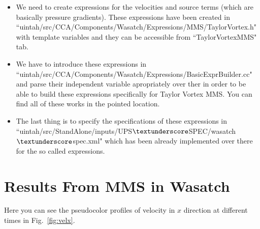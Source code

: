 \documentclass[10pt] {article}
\begin{document}
\begin{itemize}
\item
We need to create expressions for the velocities and source terms (which are basically pressure gradients). These expressions have been created in ``uintah/src/CCA/Components/Wasatch/Expressions/MMS/TaylorVortex.h" with template variables and they can be accessible from ``TaylorVortexMMS" tab.
\item
We have to introduce these expressions in\\``uintah/src/CCA/Components/Wasatch/Expressions/BasicExprBuilder.cc" and parse their independent variable apropriately over ther in order to be able to build these expressions specifically for Taylor Vortex MMS. You can find all of these works in the pointed location. 
\item
The last thing is to specify the specifications of these expressions in\\``uintah/src/StandAlone/inputs/UPS$\textunderscore$SPEC/wasatch$\textunderscore$spec.xml" which has been already implemented over there for the so called expressions. 
\end{itemize}


\section{Results From MMS in Wasatch}

Here you can see the pseudocolor profiles of velocity in $x$ direction at different times in Fig.~\ref{fig:velx}.
\end{document}

